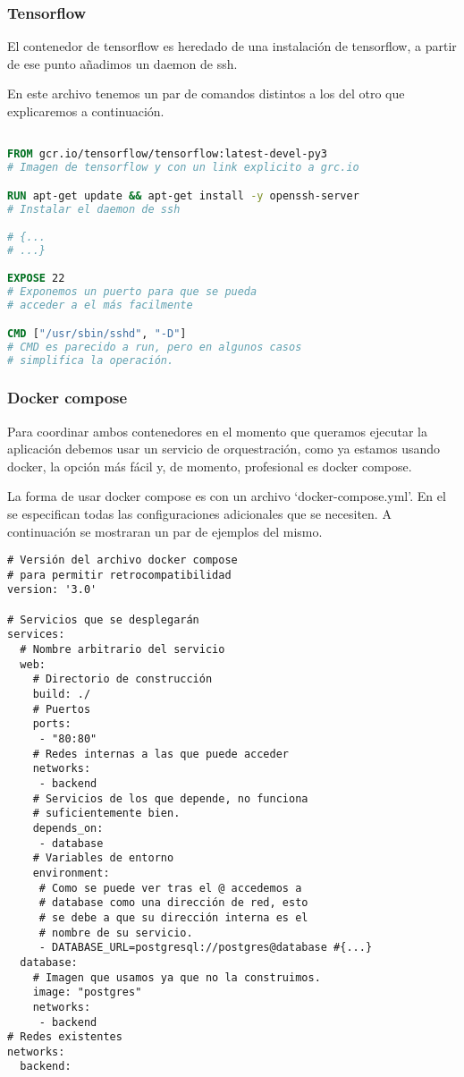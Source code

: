 \subsubsection{Tensorflow}

El contenedor de tensorflow es heredado de una instalación de tensorflow, a partir de ese punto añadimos un daemon de ssh.

En este archivo tenemos un par de comandos distintos a los del otro que explicaremos a continuación.


\begin{lstlisting}[language=dockerfile]

FROM gcr.io/tensorflow/tensorflow:latest-devel-py3
# Imagen de tensorflow y con un link explicito a grc.io

RUN apt-get update && apt-get install -y openssh-server
# Instalar el daemon de ssh

# {...
# ...}

EXPOSE 22
# Exponemos un puerto para que se pueda 
# acceder a el más facilmente

CMD ["/usr/sbin/sshd", "-D"]
# CMD es parecido a run, pero en algunos casos 
# simplifica la operación.

\end{lstlisting}


\subsubsection{Docker compose}

Para coordinar ambos contenedores en el momento que queramos ejecutar la aplicación debemos usar un servicio de orquestración, como ya estamos usando docker, la opción más fácil y, de momento, profesional es docker compose.

La forma de usar docker compose es con un archivo `docker-compose.yml'. En el se especifican todas las configuraciones adicionales que se necesiten. A continuación se mostraran un par de ejemplos del mismo.

\begin{lstlisting}[language=dockercompose]
# Versión del archivo docker compose 
# para permitir retrocompatibilidad
version: '3.0'

# Servicios que se desplegarán 
services:
  # Nombre arbitrario del servicio  
  web:
    # Directorio de construcción
    build: ./
    # Puertos
    ports:
     - "80:80"
    # Redes internas a las que puede acceder
    networks:
     - backend
    # Servicios de los que depende, no funciona
    # suficientemente bien.
    depends_on:
     - database
    # Variables de entorno
    environment:
     # Como se puede ver tras el @ accedemos a 
     # database como una dirección de red, esto
     # se debe a que su dirección interna es el 
     # nombre de su servicio.
     - DATABASE_URL=postgresql://postgres@database #{...}
  database:
    # Imagen que usamos ya que no la construimos.
    image: "postgres"
    networks:
     - backend
# Redes existentes
networks:
  backend:
\end{lstlisting}

